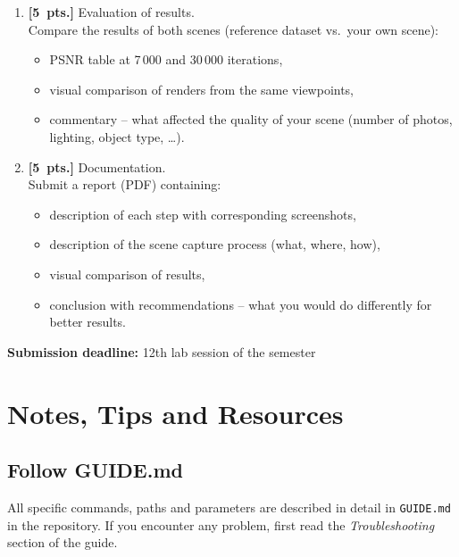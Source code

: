 \documentclass{article}
\begin{document}
\begin{enumerate}
Run the full workflow in the same way as in Task~1.
Report the achieved PSNR and visually compare the result with the reference dataset.

\item \textbf{[5~pts.]} Evaluation of results.\\
Compare the results of both scenes (reference dataset vs.\ your own scene):
\begin{itemize}
    \item PSNR table at 7\,000 and 30\,000 iterations,
    \item visual comparison of renders from the same viewpoints,
    \item commentary -- what affected the quality of your scene
          (number of photos, lighting, object type, \ldots).
\end{itemize}

\item \textbf{[5~pts.]} Documentation.\\
Submit a report (PDF) containing:
\begin{itemize}
    \item description of each step with corresponding screenshots,
    \item description of the scene capture process (what, where, how),
    \item visual comparison of results,
    \item conclusion with recommendations -- what you would do differently for better results.
\end{itemize}

\end{enumerate}

\textbf{Submission deadline:} 12th lab session of the semester

\newpage

\section*{Notes, Tips and Resources}

\subsection*{Follow GUIDE.md}

All specific commands, paths and parameters are described in detail in
\texttt{GUIDE.md} in the repository.
If you encounter any problem, first read the \emph{Troubleshooting} section of the guide.
\end{document}
